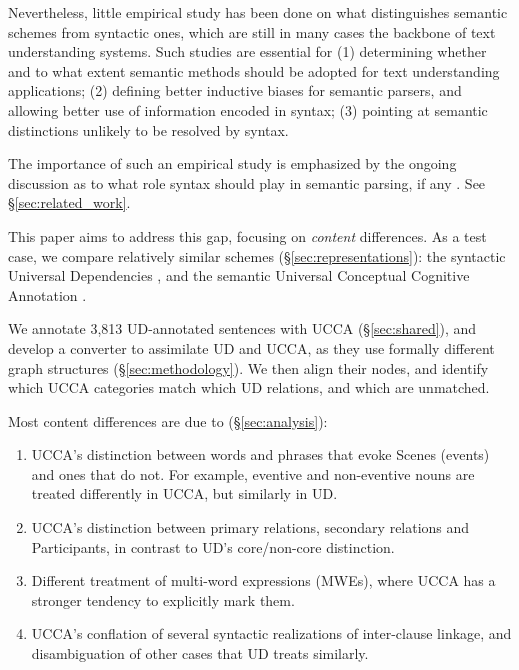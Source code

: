 \documentclass[11pt,a4paper,table]{article}
\begin{document}
  Nevertheless, little empirical study has been done on what distinguishes semantic schemes from
  syntactic ones, which are still in many cases the backbone of text understanding systems. 
  Such studies are essential for 
  (1) determining whether and to what extent semantic methods should be adopted for text understanding applications;
  (2) defining better inductive biases for semantic parsers, and allowing better use of information encoded in syntax;
  (3) pointing at semantic distinctions unlikely to be resolved by syntax.

  The importance of such an empirical study is emphasized by the ongoing discussion as to what role syntax should
  play in semantic parsing, if any \cite{swayamdipta2018syntactic,strubell2018linguistically,P18-1192,C18-1233}.
  See \S\ref{sec:related_work}.

  This paper aims to address this gap,
  focusing on {\it content} differences.
  As a test case, we compare relatively similar schemes (\S\ref{sec:representations}):
  the syntactic Universal Dependencies \cite[UD; ][]{nivre2016universal},
  and the semantic Universal Conceptual Cognitive Annotation \cite[UCCA; ][]{abend2013universal}.
  
  We annotate 3,813 UD-annotated sentences with UCCA (\S\ref{sec:shared}),
  and develop a converter to assimilate UD and UCCA,
  as they use formally different graph structures
  (\S\ref{sec:methodology}).
  We then align their nodes, and identify which UCCA categories match which UD relations,
  and which are unmatched.

  Most content differences are due to (\S\ref{sec:analysis}):
  \begin{enumerate}[itemsep=0.159mm,leftmargin=5.95mm]
      \item UCCA's distinction between words and phrases that evoke Scenes (events) and ones that do not.
        For example, eventive and non-eventive nouns are treated differently in UCCA, but similarly in UD.
      \item UCCA's distinction between primary relations, secondary relations
        and Participants, in contrast to UD's core/non-core distinction.
      \item Different treatment of multi-word expressions (MWEs),
        where UCCA has a stronger tendency to explicitly mark them.
      \item UCCA's conflation of several syntactic realizations of inter-clause linkage,
        and disambiguation of other cases that UD treats similarly.
   \end{enumerate}
\end{document}
